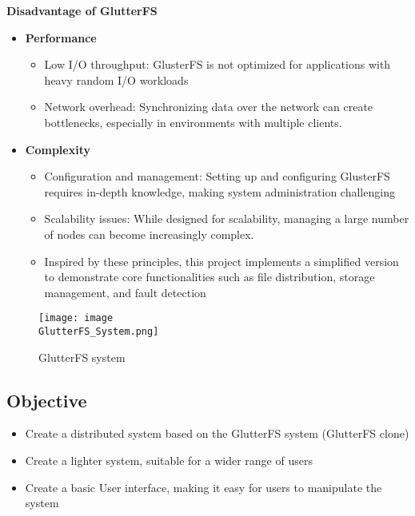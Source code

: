 \documentclass[a4paper,12pt]{article}
\begin{document}
\textbf{Disadvantage of GlutterFS}
 \begin{itemize}
     \item\textbf{Performance}
     \begin{itemize}
         \item Low I/O throughput: GlusterFS is not optimized for applications with heavy random I/O workloads
         \item Network overhead: Synchronizing data over the network can create bottlenecks, especially in environments with multiple clients.
     \end{itemize}
     \item\textbf{Complexity}
     \begin{itemize}
         \item Configuration and management: Setting up and configuring GlusterFS requires in-depth knowledge, making system administration challenging
         \item Scalability issues: While designed for scalability, managing a large number of nodes can become increasingly complex.
         \item Inspired by these principles, this project implements a simplified version to demonstrate core functionalities such as file distribution, storage management, and fault detection
     \end{itemize}
 \end{itemize}


\begin{figure}[htbp]
    \centering
    \texttt{[image: image\\GlutterFS\_System.png]}
    \caption{GlutterFS system}
    \label{fig:enter-glutterfs}
\end{figure}



\subsection{Objective}
\begin{itemize}
    \item Create a distributed system based on the GlutterFS system (GlutterFS clone)
    \item Create a lighter system, suitable for a wider range of users
    \item Create a basic User interface, making it easy for users to manipulate the system
    
\end{itemize}
\end{document}
